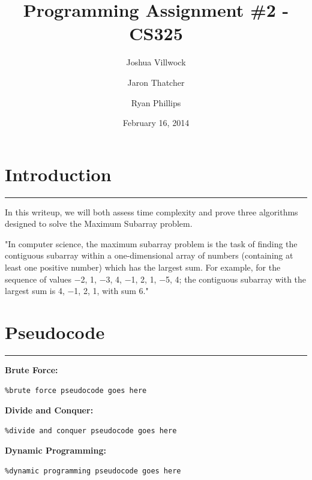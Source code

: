 \documentclass[letterpaper,10pt,titlepage,fleqn]{article}
\begin{document}
\lstset{language=Python} 

\title{Programming Assignment \#2 - CS325}

\author{
	Joshua Villwock \and
	Jaron Thatcher \and
	Ryan Phillips
}

\date{February 16, 2014}
\maketitle







\section*{Introduction}
\hrule

In this writeup, we will both assess time complexity and prove three algorithms designed to solve the Maximum Subarray problem. 

"In computer science, the maximum subarray problem is the task of finding the contiguous subarray within a one-dimensional array of numbers (containing at least one positive number) which has the largest sum. For example, for the sequence of values −2, 1, −3, 4, −1, 2, 1, −5, 4; the contiguous subarray with the largest sum is 4, −1, 2, 1, with sum 6."










\section*{Pseudocode}
\hrule
\begin{centering}

    \textbf{Brute Force:}
    \end{centering}
    \begin{lstlisting}%brute force pseudocode goes here
    \end{lstlisting}

    \begin{centering}
    \textbf{Divide and Conquer:}
    \end{centering}
    \begin{lstlisting}%divide and conquer pseudocode goes here
    \end{lstlisting}

    \begin{centering}
    \textbf{Dynamic Programming:}
    \end{centering}
    \begin{lstlisting}%dynamic programming pseudocode goes here
    \end{lstlisting}
\end{document}
